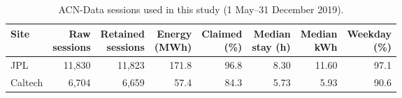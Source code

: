 \begin{table}[!htbp]
\centering
\caption{ACN-Data sessions used in this study (1 May--31 December 2019).}
\label{tab:data}
\footnotesize
\setlength{\tabcolsep}{1.5pt}
\begin{tabular*}{\textwidth}{@{\extracolsep{\fill}}lrrrrrrr@{}}
\hline
Site & \makecell[c]{Raw\\sessions} & \makecell[c]{Retained\\sessions} & \makecell[c]{Energy\\(MWh)} & \makecell[c]{Claimed\\(\%)} & \makecell[c]{Median\\stay (h)} & \makecell[c]{Median\\kWh} & \makecell[c]{Weekday\\(\%)} \\
\hline
JPL & 11,830 & 11,823 & 171.8 & 96.8 & 8.30 & 11.60 & 97.1 \\
Caltech & 6,704 & 6,659 & 57.4 & 84.3 & 5.73 & 5.93 & 90.6 \\
\hline
\end{tabular*}
\end{table}
